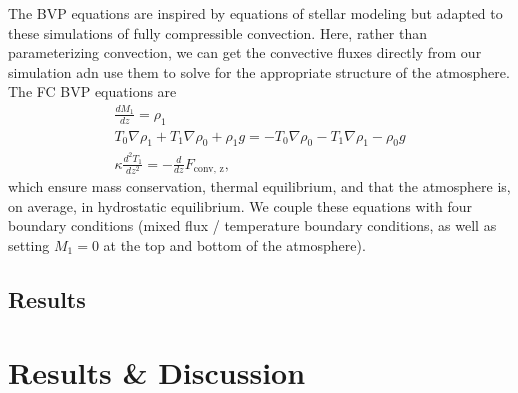 \documentclass[titlepage, twocolumn, fontsize=10]{aastex6}
\newcommand{\grad}{\ensuremath{\nabla}}
\begin{document}
The BVP equations are inspired by equations of stellar modeling  \cite{paxton&all2011} but adapted to these simulations
of fully compressible convection.  Here, rather than parameterizing convection, we can get the
convective fluxes directly from our simulation adn use them to solve for the appropriate structure
of the atmosphere.  The FC BVP equations are
\begin{gather}
\frac{d M_1}{dz} = \rho_1 \\
T_0 \grad \rho_1 + T_1 \grad \rho_0 + \rho_1 g = - T_0 \grad \rho_0 - T_1 \grad \rho_1 - \rho_0 g \\
\kappa \frac{d^2 T_1}{d z^2} = -\frac{d}{dz}F_{\text{conv, z}},
\end{gather}
which ensure mass conservation, thermal equilibrium, and that the atmosphere is, on average,
in hydrostatic equilibrium.  We couple these equations with four boundary conditions (mixed
flux / temperature boundary conditions, as well as setting $M_1 = 0$ at the top and bottom
of the atmosphere).

\subsection{Results}





\section{Results \& Discussion}
\label{sec:results}


\end{document}
